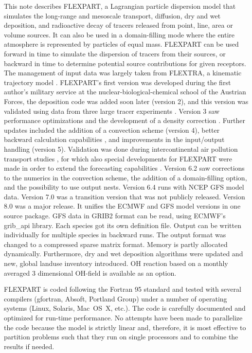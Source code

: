 \documentclass{egu}                  %
\begin{document}
This note describes FLEXPART, a Lagrangian particle dispersion model that
simulates the long-range and mesoscale transport, diffusion, dry and wet
deposition, and radioactive decay of tracers released from point, line, area or
volume sources.  It can also be used in a domain-filling mode where the entire
atmosphere is represented by particles of equal mass.  FLEXPART can be used
forward in time to simulate the dispersion of tracers from their sources, or
backward in time to determine potential source contributions for given
receptors.  The management of input data was largely taken from FLEXTRA, a
kinematic trajectory model \citep{stohl1995}.  FLEXPART's first version was
developed during the first author's military service at the
nuclear-biological-chemical school of the Austrian Forces, the deposition code
was added soon later (version 2), and this version was validated using data
from three large tracer experiments \citep{stohletal1998}.  Version 3 saw
performance optimizations and the development of a density correction
\citep{stohlthomson1999}.  Further updates included the addition of a
convection scheme \citep{seibertetal2001} (version 4), better backward
calculation capabilities \citep{seibert2004}, and improvements in the
input/output handling (version 5).  Validation was done during intercontinental
air pollution transport studies \citep{stohl1999, forster2001, spichtinger2001,
stohl2002, stohl2003}, for which also special developments for FLEXPART were
made in order to extend the forecasting capabilities \citep{stohl2004}.
Version 6.2 saw corrections to the numerics in the convection scheme, the
addition of a domain-filling option, and the possibility to use output nests.
Version 6.4 runs with NCEP GFS model data.  Version 7.0 was a transition
version that was not publicly released.  Version 8.0 was a major release.  It
unifies the ECMWF and GFS model versions in one source package. GFS data in
GRIB2 format can be read, using ECMWF's grib\_api library. Each species
got its own definition file.  Output can be written individually for multiple
species in backward runs.  The output format was changed to a compressed sparse
matrix format.  Memory is partly allocated dynamically.  Furthermore, dry and
wet deposition algorithms were updated and new, global landuse inventory
introduced.  OH reaction based on a monthly averaged 3 dimensional OH-field is
available as an option.

FLEXPART is coded following the Fortran 95 standard and tested with several
compilers (gfortran, Absoft, Portland Group) under a number of operating
systems (Linux, Solaris, Mac~OS~X, etc.).  The code is carefully documented and
optimized for run-time performance.  No attempts have been made to parallelize
the code because the model is strictly linear and, therefore, it is most
effective to partition problems such that they run on single processors and to
combine the results if needed.
\end{document}
